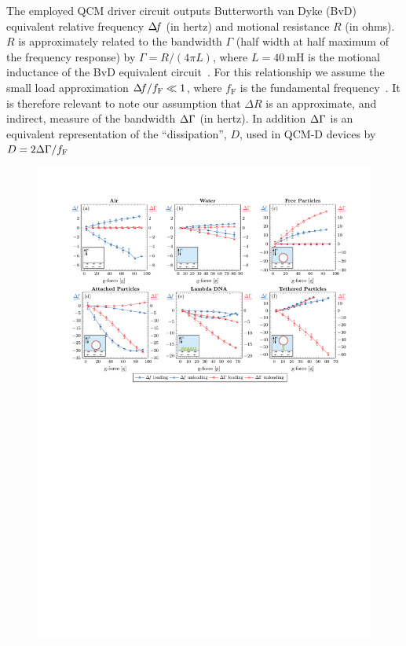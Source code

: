 The employed QCM driver circuit outputs Butterworth van Dyke (BvD)
equivalent relative frequency $\Delta\!f$ (in hertz) and motional resistance $R$ (in ohms).
$R$ is approximately related to the bandwidth $\Gamma$ (half width at half
maximum of the frequency response) by $\Gamma=R/\left(4\pi L\right)$, where
$L=\SI{40}{\milli\henry}$ is the motional inductance of the BvD
equivalent circuit~\cite{arnau2002circuit}.  For this
relationship we assume the small load approximation $\Delta\!f/f_\mathrm{F} \ll
1$, where $f_\mathrm{F}$ is the fundamental frequency~\cite{geelhood2002transient}.
It is therefore relevant to note our assumption that $\Delta R$ is an
approximate, and indirect, measure of the bandwidth $\Delta\Gamma$ (in
hertz).  In addition $\Delta\Gamma$ is an equivalent representation of the ``dissipation'', $D$, used in
QCM-D devices by $D=2\Delta\Gamma/f_\mathrm{F}$ 
\begin{figure}[ht]
\centering
\includegraphics{qcm/figures/figure2.pdf}

\end{figure}
